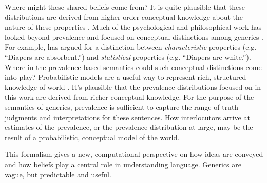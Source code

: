 \documentclass[10pt,letterpaper]{article}
\begin{document}
Where might these shared beliefs come from?
It is quite plausible that these distributions are derived from higher-order conceptual knowledge about the nature of these properties \cite{Gelman2005, Keil1992}.
Much of the psychological and philosophical work has looked beyond prevalence and focused on conceptual distinctions among generics \cite{Prasada2013, Leslie2008}. For example, \citeauthor{Prasada2013} has argued for a distinction between \emph{characteristic} properties (e.g. ``Diapers are absorbent.'') and \emph{statistical} properties (e.g. ``Diapers are white.'').
 Where in the prevalence-based semantics could such conceptual distinctions come into play?
Probabilistic models are a useful way to represent rich, structured knowledge of world \cite{Goodmanconcepts}. It's plausible that the prevalence distributions focused on in this work are derived from richer conceptual knowledge. For the purpose of the semantics of generics, prevalence is sufficient to capture the range of truth judgments  and interpretations for these sentences. How interlocutors arrive at estimates of the prevalence, or the prevalence distribution at large, may be the result of a probabilistic, conceptual model of the world. 

This formalism gives a new, computational perspective on how ideas are conveyed and how beliefs play a central role in understanding language.
Generics are vague, but predictable and useful.




\setlength{\bibleftmargin}{.125in}
\setlength{\bibindent}{-\bibleftmargin}


\end{document}
